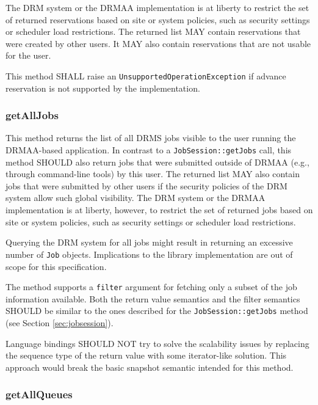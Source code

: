 \documentclass{article}
\newcommand{\h}[1]{\lstinline|#1|}
\newcommand{\langbind}[1]{\begin{shaded}#1\end{shaded}}
\newcommand{\rat}[1]{}
\begin{document}
 The DRM system or the DRMAA implementation is at liberty to restrict the set of returned reservations based on site or system policies, such as security settings or scheduler load restrictions. The returned list MAY contain reservations that were created by other users. It MAY also contain reservations that are not usable for the user.

This method SHALL raise an \h{UnsupportedOperationException} if advance reservation is not supported by the implementation.

\subsubsection{getAllJobs}

This method returns the list of all DRMS jobs visible to the user running the DRMAA-based application. In contrast to a \h{JobSession::getJobs} call, this method SHOULD also return jobs that were submitted outside of DRMAA (e.g., through command-line tools) by this user. The returned list MAY also contain jobs that were submitted by other users if the security policies of the DRM system allow such global visibility. The DRM system or the DRMAA implementation is at liberty, however, to restrict the set of returned jobs based on site or system policies, such as security settings or scheduler load restrictions.

Querying the DRM system for all jobs might result in returning an excessive number of \h{Job} objects. Implications to the library implementation are out of scope for this specification. 

The method supports a \h{filter} argument for fetching only a subset of the job information available. Both the return value semantics and the filter semantics SHOULD be similar to the ones described for the \h{JobSession::getJobs} method (see Section \ref{sec:jobsession}). 

\langbind{
Language bindings SHOULD NOT try to solve the scalability issues by replacing the sequence type of the return value with some iterator-like solution. This approach would break the basic snapshot semantic intended for this method.
}

\rat{
The non-argumentation about the scalability problem was the final result of a clarification attempt. We hand this one over to the implementors. (conf call Jul 14th 2010)
}

\subsubsection{getAllQueues}
\end{document}
